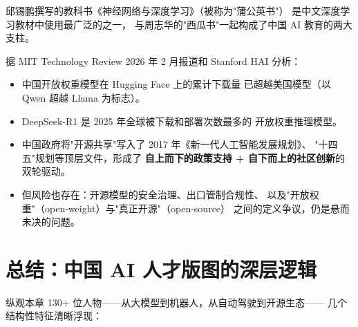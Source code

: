 邱锡鹏撰写的教科书《神经网络与深度学习》（被称为"蒲公英书"）
是中文深度学习教材中使用最广泛的之一，
与周志华的"西瓜书"一起构成了中国 AI 教育的两大支柱。

\begin{corebox}
据 MIT Technology Review 2026 年 2 月报道和 Stanford HAI 分析：
\begin{itemize}[noitemsep]
  \item 中国开放权重模型在 Hugging Face 上的累计下载量
        已超越美国模型（以 Qwen 超越 Llama 为标志）。
  \item DeepSeek-R1 是 2025 年全球被下载和部署次数最多的
        开放权重推理模型。
  \item 中国政府将"开源共享"写入了 2017 年《新一代人工智能发展规划》、
        "十四五"规划等顶层文件，形成了
        \textbf{自上而下的政策支持 + 自下而上的社区创新}的双轮驱动。
  \item 但风险也存在：开源模型的安全治理、出口管制合规性、
        以及"开放权重"（open-weight）与"真正开源"（open-source）
        之间的定义争议，仍是悬而未决的问题。
\end{itemize}
\end{corebox}



\section{总结：中国 AI 人才版图的深层逻辑}

纵观本章 130+ 位人物——从大模型到机器人，从自动驾驶到开源生态——
几个结构性特征清晰浮现：

